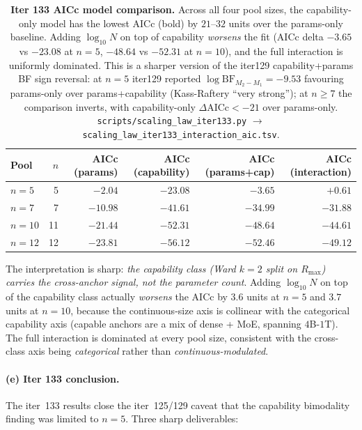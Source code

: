 \documentclass{article}
\begin{document}
\begin{table}[t]
  \centering
  \small
  \begin{tabular}{lrrrrr}
    \toprule
    Pool & $n$ & AICc (params) & AICc (capability) &
           AICc (params+cap) & AICc (interaction) \\
    \midrule
    $n=5$  &  5 & $-2.04$  & $\mathbf{-23.08}$ & $-3.65$  & $+0.61$ \\
    $n=7$  &  7 & $-10.98$ & $\mathbf{-41.61}$ & $-34.99$ & $-31.88$ \\
    $n=10$ & 11 & $-21.44$ & $\mathbf{-52.31}$ & $-48.64$ & $-44.61$ \\
    $n=12$ & 12 & $-23.81$ & $\mathbf{-56.12}$ & $-52.46$ & $-49.12$ \\
    \bottomrule
  \end{tabular}
  \caption{\textbf{Iter 133 AICc model comparison.}
    Across all four pool sizes, the capability-only model has the
    lowest AICc (bold) by $21$--$32$ units over the params-only
    baseline.  Adding $\log_{10} N$ on top of capability
    \emph{worsens} the fit (AICc delta $-3.65$ vs $-23.08$ at
    $n=5$, $-48.64$ vs $-52.31$ at $n=10$), and the full
    interaction is uniformly dominated.  This is a sharper
    version of the iter129 capability+params BF sign reversal:
    at $n=5$ iter129 reported $\log \mathrm{BF}_{M_2 - M_1} =
    -9.53$ favouring params-only over params+capability
    (Kass-Raftery ``very strong''); at $n \ge 7$ the comparison
    inverts, with capability-only $\Delta\text{AICc} < -21$
    over params-only.  \texttt{scripts/scaling\_law\_iter133.py}
    $\to$ \texttt{scaling\_law\_iter133\_interaction\_aic.tsv}.}
  \label{tab:scaling-iter133-aic}
\end{table}

The interpretation is sharp: \emph{the capability class (Ward
$k=2$ split on $R_{\max}$) carries the cross-anchor signal,
not the parameter count}.  Adding $\log_{10} N$ on top of the
capability class actually \emph{worsens} the AICc by $3.6$
units at $n=5$ and $3.7$ units at $n=10$, because the
continuous-size axis is collinear with the categorical
capability axis (capable anchors are a mix of dense + MoE,
spanning $4$B-$1$T).  The full interaction is dominated at
every pool size, consistent with the cross-class axis being
\emph{categorical} rather than \emph{continuous-modulated}.

\paragraph{(e) Iter 133 conclusion.}
\label{par:scaling-iter133-conclusion}
The iter~133 results close the iter~125/129 caveat that the
capability bimodality finding was limited to $n = 5$.  Three
sharp deliverables:
\end{document}
